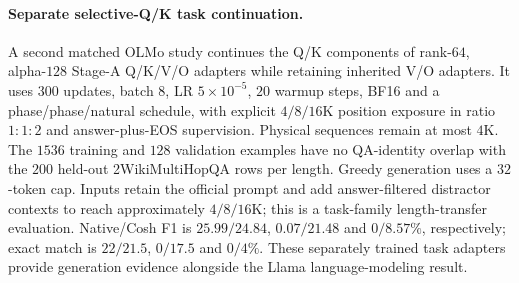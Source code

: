 \paragraph{Separate selective-Q/K task continuation.}
A second matched OLMo study continues the Q/K components of rank-$64$,
alpha-$128$ Stage-A Q/K/V/O adapters while retaining inherited V/O adapters.
It uses $300$ updates, batch $8$, LR $5\times10^{-5}$, $20$ warmup steps,
BF16 and a phase/phase/natural schedule, with explicit $4/8/16$K position
exposure in ratio $1:1:2$ and answer-plus-EOS supervision. Physical sequences
remain at most $4$K. The $1536$ training and $128$ validation examples have
no QA-identity overlap with the $200$ held-out 2WikiMultiHopQA rows per length.
Greedy generation uses a $32$-token cap. Inputs retain the official prompt
and add answer-filtered distractor contexts to reach approximately $4/8/16$K;
this is a task-family length-transfer evaluation. Native/Cosh F1 is
$25.99/24.84$, $0.07/21.48$ and $0/8.57\%$, respectively; exact match is
$22/21.5$, $0/17.5$ and $0/4\%$. These separately trained task adapters
provide generation evidence alongside the Llama language-modeling result.
